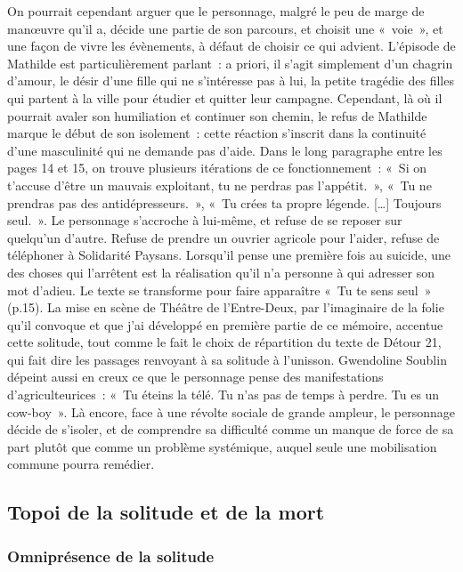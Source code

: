 \documentclass[
]{article}
\begin{document}
On pourrait cependant arguer que le personnage, malgré le peu de marge de manœuvre qu'il a, décide une partie de son parcours, et choisit une «~voie~», et une façon de vivre les évènements, à défaut de choisir ce qui advient. L'épisode de Mathilde est particulièrement parlant~: a priori, il s'agit simplement d'un chagrin d'amour, le désir d'une fille qui ne s'intéresse pas à lui, la petite tragédie des filles qui partent à la ville pour étudier et quitter leur campagne. Cependant, là où il pourrait avaler son humiliation et continuer son chemin, le refus de Mathilde marque le début de son isolement~: cette réaction s'inscrit dans la continuité d'une masculinité qui ne demande pas d'aide. Dans le long paragraphe entre les pages 14 et 15, on trouve plusieurs itérations de ce fonctionnement~: «~Si on t'accuse d'être un mauvais exploitant, tu ne perdras pas l'appétit.~», «~Tu ne prendras pas des antidépresseurs.~», «~Tu crées ta propre légende. {[}\ldots{]} Toujours seul.~». Le personnage s'accroche à lui-même, et refuse de se reposer sur quelqu'un d'autre. Refuse de prendre un ouvrier agricole pour l'aider, refuse de téléphoner à Solidarité Paysans. Lorsqu'il pense une première fois au suicide, une des choses qui l'arrêtent est la réalisation qu'il n'a personne à qui adresser son mot d'adieu. Le texte se transforme pour faire apparaître «~Tu te sens seul~» (p.15). La mise en scène de Théâtre de l'Entre-Deux, par l'imaginaire de la folie qu'il convoque et que j'ai développé en première partie de ce mémoire, accentue cette solitude, tout comme le fait le choix de répartition du texte de Détour 21, qui fait dire les passages renvoyant à sa solitude à l'unisson. Gwendoline Soublin dépeint aussi en creux ce que le personnage pense des manifestations d'agriculteurices~: «~Tu éteins la télé. Tu n'as pas de temps à perdre. Tu es un cow-boy~». Là encore, face à une révolte sociale de grande ampleur, le personnage décide de s'isoler, et de comprendre sa difficulté comme un manque de force de sa part plutôt que comme un problème systémique, auquel seule une mobilisation commune pourra remédier.

\subsection{Topoi de la solitude et de la mort}\label{topoi-de-la-solitude-et-de-la-mort}

\subsubsection{Omniprésence de la solitude}\label{omnipruxe9sence-de-la-solitude}
\end{document}
